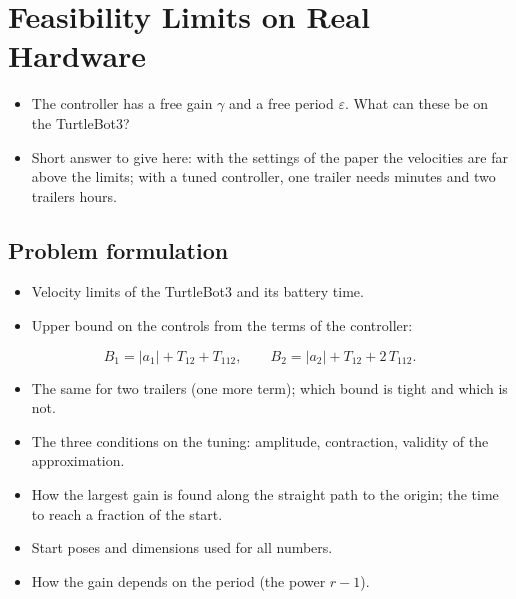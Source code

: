 
\chapter{Feasibility Limits on Real Hardware}
\label{ch:feasibility}

\begin{itemize}
  \item The controller has a free gain $\gamma$ and a free period $\varepsilon$. What can these be on the TurtleBot3?
  \item Short answer to give here: with the settings of the paper the velocities are far above the limits; with a tuned controller, one trailer needs minutes and two trailers hours.
\end{itemize}

\section{Problem formulation}
\label{sec:feas-problem}

\begin{itemize}
  \item Velocity limits of the TurtleBot3 and its battery time.
  \item Upper bound on the controls from the terms of the controller:
\end{itemize}
\begin{equation}
  B_1=|a_1|+T_{12}+T_{112},\qquad
  B_2=|a_2|+T_{12}+2\,T_{112}.
  \label{eq:bound3}
\end{equation}
\begin{itemize}
  \item The same for two trailers (one more term); which bound is tight and which is not.
  \item The three conditions on the tuning: amplitude, contraction, validity of the approximation.
  \item How the largest gain is found along the straight path to the origin; the time to reach a fraction of the start.
  \item Start poses and dimensions used for all numbers.
  \item How the gain depends on the period (the power $r-1$).
\end{itemize}

